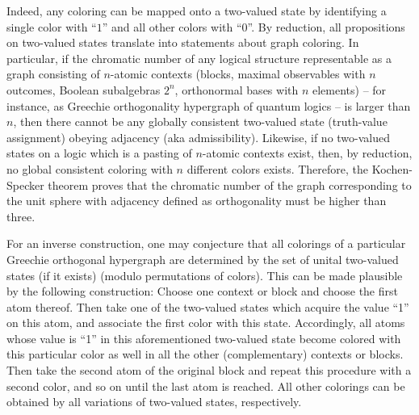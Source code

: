 Indeed, any coloring can be mapped onto a two-valued state by identifying
a single color with ``$1$'' and all other colors with ``$0$''.
By reduction, all propositions on two-valued states translate into statements about graph coloring.
In particular, if the chromatic number of any logical structure representable as a graph consisting of $n$-atomic
contexts
(blocks, maximal observables with $n$ outcomes, Boolean subalgebras $2^n$, orthonormal bases with $n$ elements)
--
for instance, as Greechie orthogonality hypergraph of quantum logics
--
is larger than $n$,
then there cannot be any globally consistent two-valued state (truth-value assignment) obeying adjacency (aka admissibility).
Likewise, if no two-valued states  on a logic
which is a pasting of $n$-atomic contexts
exist, then, by reduction, no global consistent coloring with $n$ different colors exists.
Therefore, the Kochen-Specker theorem proves that the chromatic number of the graph corresponding to
the unit sphere with adjacency defined as orthogonality must be higher than three.

For an inverse construction, one may conjecture that all colorings of a particular
Greechie orthogonal hypergraph are determined by the set of unital two-valued states (if it exists)
(modulo permutations of colors).
This can be made plausible by the following construction:
Choose one context or block and choose the first atom thereof.
Then take one of the two-valued states which acquire the value ``1'' on this atom, and associate the first color with this state.
Accordingly, all atoms whose value is ``1'' in this aforementioned two-valued state become
colored with this particular color as well in all the other (complementary) contexts or blocks.
Then take the second atom of the original block and repeat this procedure with a second color, and so on until the last atom is reached.
All other colorings can be obtained by all variations of two-valued states, respectively.





